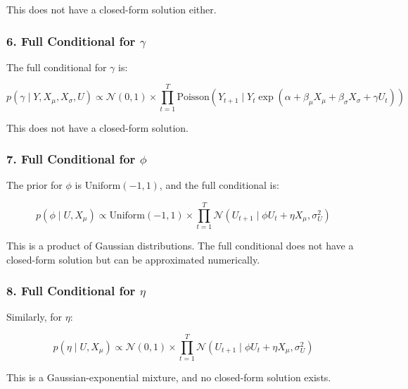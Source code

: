 \documentclass[
  letterpaper,
  DIV=11,
  numbers=noendperiod]{scrartcl}
\begin{document}
This does not have a closed-form solution either.

\subsubsection{\texorpdfstring{6. Full Conditional for
\(\gamma\)}{6. Full Conditional for \textbackslash gamma}}\label{full-conditional-for-gamma}

The full conditional for \(\gamma\) is:

\begin{equation}
p(\gamma \mid Y, X_{\mu}, X_{\sigma}, U) \propto \mathcal{N}(0, 1) \times \prod_{t=1}^{T} \text{Poisson}(Y_{t+1} \mid Y_t \exp(\alpha + \beta_{\mu} X_{\mu} + \beta_{\sigma} X_{\sigma} + \gamma U_t))
\end{equation}

This does not have a closed-form solution.

\subsubsection{\texorpdfstring{7. Full Conditional for
\(\phi\)}{7. Full Conditional for \textbackslash phi}}\label{full-conditional-for-phi}

The prior for \(\phi\) is \(\text{Uniform}(-1, 1)\), and the full
conditional is:

\begin{equation}
p(\phi \mid U, X_{\mu}) \propto \text{Uniform}(-1, 1) \times \prod_{t=1}^{T} \mathcal{N}(U_{t+1} \mid \phi U_t + \eta X_{\mu}, \sigma_U^2)
\end{equation}

This is a product of Gaussian distributions. The full conditional does
not have a closed-form solution but can be approximated numerically.

\subsubsection{\texorpdfstring{8. Full Conditional for
\(\eta\)}{8. Full Conditional for \textbackslash eta}}\label{full-conditional-for-eta}

Similarly, for \(\eta\):

\begin{equation}
p(\eta \mid U, X_{\mu}) \propto \mathcal{N}(0, 1) \times \prod_{t=1}^{T} \mathcal{N}(U_{t+1} \mid \phi U_t + \eta X_{\mu}, \sigma_U^2)
\end{equation}

This is a Gaussian-exponential mixture, and no closed-form solution
exists.
\end{document}

